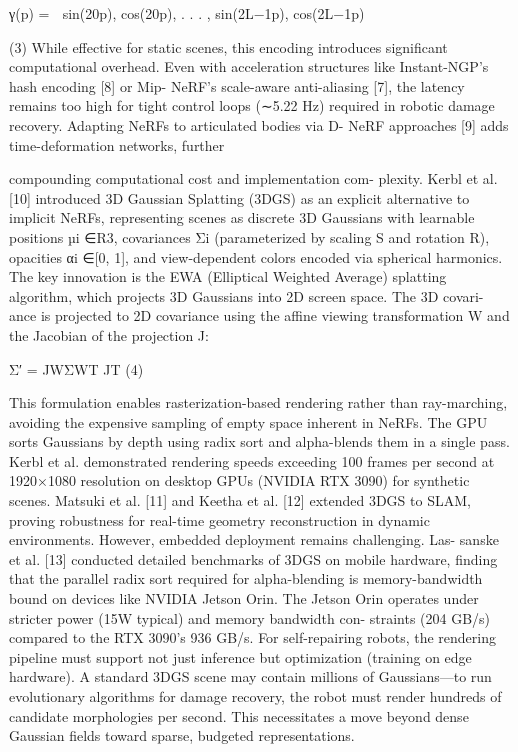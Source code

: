 \documentclass[10pt,twocolumn,letterpaper]{article}
\begin{document}
γ(p) =  sin(20p), cos(20p), . . . , sin(2L−1p), cos(2L−1p) 

(3) While effective for static scenes, this encoding introduces significant computational overhead. Even with acceleration structures like Instant-NGP’s hash encoding [8] or Mip- NeRF’s scale-aware anti-aliasing [7], the latency remains too high for tight control loops (∼5.22 Hz) required in robotic damage recovery. Adapting NeRFs to articulated bodies via D- NeRF approaches [9] adds time-deformation networks, further

compounding computational cost and implementation com- plexity. Kerbl et al. [10] introduced 3D Gaussian Splatting (3DGS) as an explicit alternative to implicit NeRFs, representing scenes as discrete 3D Gaussians with learnable positions µi ∈R3, covariances Σi (parameterized by scaling S and rotation R), opacities αi ∈[0, 1], and view-dependent colors encoded via spherical harmonics. The key innovation is the EWA (Elliptical Weighted Average) splatting algorithm, which projects 3D Gaussians into 2D screen space. The 3D covari- ance is projected to 2D covariance using the affine viewing transformation W and the Jacobian of the projection J:

Σ′ = JWΣWT JT (4)

This formulation enables rasterization-based rendering rather than ray-marching, avoiding the expensive sampling of empty space inherent in NeRFs. The GPU sorts Gaussians by depth using radix sort and alpha-blends them in a single pass. Kerbl et al. demonstrated rendering speeds exceeding 100 frames per second at 1920×1080 resolution on desktop GPUs (NVIDIA RTX 3090) for synthetic scenes. Matsuki et al. [11] and Keetha et al. [12] extended 3DGS to SLAM, proving robustness for real-time geometry reconstruction in dynamic environments. However, embedded deployment remains challenging. Las- sanske et al. [13] conducted detailed benchmarks of 3DGS on mobile hardware, finding that the parallel radix sort required for alpha-blending is memory-bandwidth bound on devices like NVIDIA Jetson Orin. The Jetson Orin operates under stricter power (15W typical) and memory bandwidth con- straints (204 GB/s) compared to the RTX 3090’s 936 GB/s. For self-repairing robots, the rendering pipeline must support not just inference but optimization (training on edge hardware). A standard 3DGS scene may contain millions of Gaussians—to run evolutionary algorithms for damage recovery, the robot must render hundreds of candidate morphologies per second. This necessitates a move beyond dense Gaussian fields toward sparse, budgeted representations.
\end{document}
